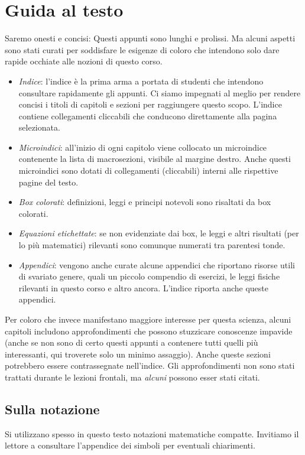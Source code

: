 \chapter*{Guida al testo}
Saremo onesti e concisi: Questi appunti sono lunghi e prolissi.
Ma alcuni aspetti sono
stati curati per soddisfare le esigenze di coloro che intendono solo dare rapide
occhiate alle nozioni di questo corso.

\begin{itemize}
    \item \textit{Indice}: l'indice è la prima arma a portata di studenti che intendono
    consultare rapidamente gli appunti. Ci siamo impegnati al meglio per rendere
    concisi i titoli di capitoli e sezioni per raggiungere questo scopo. L'indice
    contiene collegamenti cliccabili che conducono direttamente alla pagina selezionata.

    \item \textit{Microindici}: all'inizio di ogni capitolo viene collocato un microindice
    contenente la lista di macrosezioni, visibile al margine destro. Anche questi microindici sono dotati di
    collegamenti (cliccabili) interni alle rispettive pagine del testo.

    \item \textit{Box colorati}: definizioni, leggi e principi notevoli sono risaltati
    da box colorati.
    
    \item \textit{Equazioni etichettate}: se non evidenziate dai box, le leggi e altri
    risultati (per lo più matematici) rilevanti sono comunque numerati tra
    parentesi tonde.

    \item \textit{Appendici}: vengono anche curate alcune appendici che riportano risorse
    utili di svariato genere, quali un piccolo compendio di esercizi, le leggi
    fisiche rilevanti in questo corso e altro ancora. L'indice riporta anche
    queste appendici.
\end{itemize}

Per coloro che invece manifestano maggiore interesse per questa scienza, alcuni
capitoli includono approfondimenti che possono stuzzicare conoscenze impavide (anche
se non sono di certo questi appunti a contenere tutti quelli più interessanti,
qui troverete solo un minimo assaggio). Anche queste sezioni potrebbero essere
contrassegnate nell'indice.
Gli approfondimenti non sono stati trattati durante le lezioni frontali, ma
\textit{alcuni} possono esser stati citati.

\section*{Sulla notazione}
Si utilizzano spesso in questo testo notazioni matematiche compatte.
Invitiamo il lettore a consultare l'appendice dei simboli per eventuali
chiarimenti.

